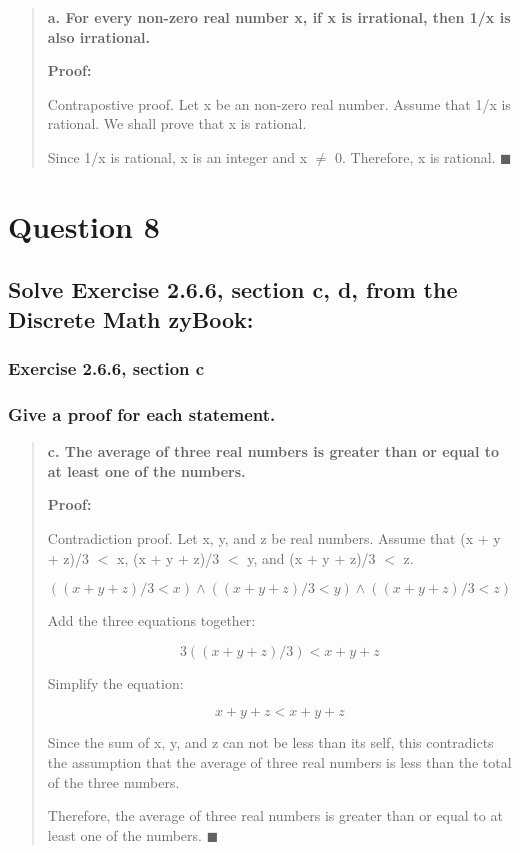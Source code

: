 \documentclass[11pt, oneside]{article}
\begin{document}
\begin{quote}
    \textbf{a. For every non-zero real number x, if x is irrational, then 1/x is also irrational.}
    
    \textbf{Proof:}
    
    Contrapostive proof. Let x be an non-zero real number. Assume that 1/x is rational. We shall prove that x is rational.
    
    Since 1/x is rational, x is an integer and x $\ne$ 0. Therefore, x is rational. $\blacksquare$
\end{quote}

\pagebreak

\section*{Question 8}

\subsection*{Solve Exercise 2.6.6, section c, d, from the Discrete Math zyBook:}

\subsubsection*{Exercise 2.6.6, section c}

\subsubsection*{Give a proof for each statement.}

\begin{quote}
    \textbf{c. The average of three real numbers is greater than or equal to at least one of the numbers.}
    
    \textbf{Proof:}
    
    Contradiction proof. Let x, y, and z be real numbers. Assume that (x + y + z)/3 $<$ x, (x + y + z)/3 $<$ y, and (x + y + z)/3 $<$ z.
    
    \[((x + y + z)/3 < x) \land ((x + y + z)/3 < y) \land ((x + y + z)/3 < z)\]
    
    Add the three equations together:
    
    \[3((x + y + z)/3) < x + y + z\]
    
    Simplify the equation:
    
    \[x + y + z < x + y + z\]
    
    Since the sum of x, y, and z can not be less than its self, this contradicts the assumption that the average of three real numbers is less than the total of the three numbers.
    
    Therefore, the average of three real numbers is greater than or equal to at least one of the numbers. $\blacksquare$
\end{quote}
\end{document}
